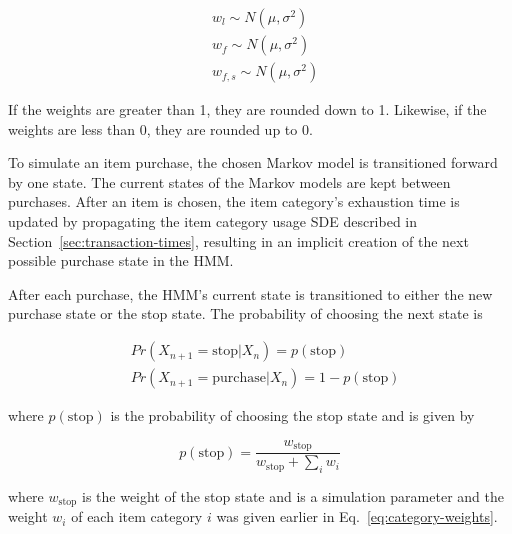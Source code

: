 \documentclass[conference]{IEEEtran}
\begin{document}
\begin{align*}
&w_l \sim N(\mu, \sigma^2) \\
&w_f \sim N(\mu, \sigma^2) \\
&w_{f, s} \sim N(\mu, \sigma^2)
\end{align*}

If the weights are greater than 1, they are rounded down to 1.  Likewise, if the weights are less than 0, they are rounded up to 0.



To simulate an item purchase, the chosen Markov model is transitioned forward by one state. The current states of the Markov models are kept between purchases.  After an item is chosen, the item category's exhaustion time is updated by propagating the item category usage SDE described in Section~\ref{sec:transaction-times}, resulting in an implicit creation of the next possible purchase state in the HMM.

After each purchase, the HMM's current state is transitioned to either the new purchase state or the stop state.  The probability of choosing the next state is 

\begin{align*}
&Pr(X_{n+1}=\text{stop}|X_n) = p(\text{stop})\\
&Pr(X_{n+1}=\text{purchase}|X_n) = 1 - p(\text{stop})
\end{align*}

where $p(\text{stop})$ is the probability of choosing the stop state and is given by

\begin{equation*}
 p(\text{stop}) = \frac{w_{\text{stop}}}{w_{\text{stop}} + \sum_i w_i}
\end{equation*}

where $w_{\text{stop}}$ is the weight of the stop state and is a simulation parameter and the weight $w_i$ of each item category $i$ was given earlier in Eq.~\ref{eq:category-weights}.
\end{document}

